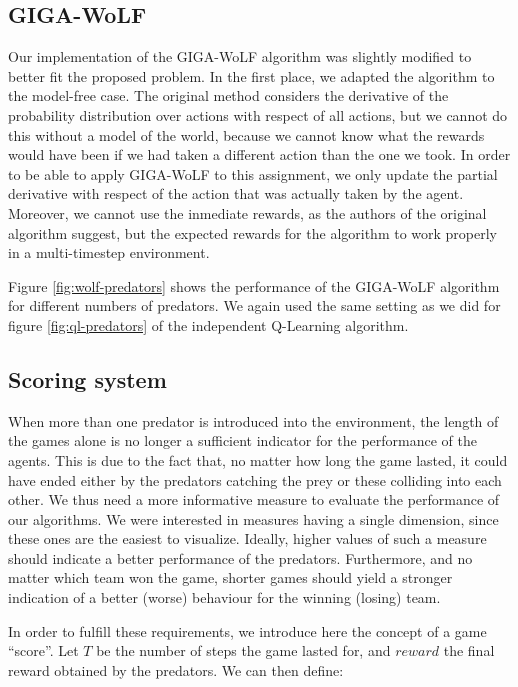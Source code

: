 \documentclass[a4paper,12pt]{article}
\begin{document}
\subsection{GIGA-WoLF}

Our implementation of the GIGA-WoLF algorithm was slightly modified to better fit the proposed problem. In the first place, we adapted the algorithm to the model-free case. The original method considers the derivative of the probability distribution over actions with respect of all actions, but we cannot do this without a model of the world, because we cannot know what the rewards would have been if we had taken a different action than the one we took. In order to be able to apply GIGA-WoLF to this assignment, we only update the partial derivative with respect of the action that was actually taken by the agent. Moreover, we cannot use the inmediate rewards, as the authors of the original algorithm suggest, but the expected rewards for the algorithm to work properly in a multi-timestep environment.

Figure \ref{fig:wolf-predators} shows the performance of the GIGA-WoLF algorithm for different numbers of predators. We again used the same setting as we did for figure \ref{fig:ql-predators} of the independent Q-Learning algorithm.

\subsection{Scoring system}

When more than one predator is introduced into the environment, the length of the games alone is no longer a sufficient indicator for the performance of the agents. This is due to the fact that, no matter how long the game lasted, it could have ended either by the predators catching the prey or these colliding into each other. We thus need a more informative measure to evaluate the performance of our algorithms. We were interested in measures having a single dimension, since these ones are the easiest to visualize. Ideally, higher values of such a measure should indicate a better performance of the predators. Furthermore, and no matter which team won the game, shorter games should yield a stronger indication of a better (worse) behaviour for the winning (losing) team.

In order to fulfill these requirements, we introduce here the concept of a game ``score''. Let $T$ be the number of steps the game lasted for, and $reward$ the final reward obtained by the predators. We can then define:
\end{document}
